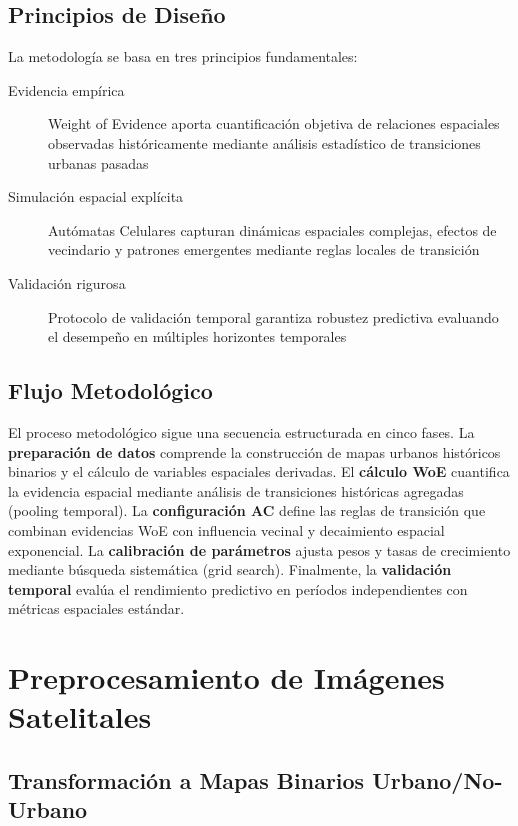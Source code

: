 \subsection{Principios de Diseño}

La metodología se basa en tres principios fundamentales:

\begin{description}
\item[Evidencia empírica] Weight of Evidence aporta cuantificación objetiva de relaciones espaciales observadas históricamente mediante análisis estadístico de transiciones urbanas pasadas
\item[Simulación espacial explícita] Autómatas Celulares capturan dinámicas espaciales complejas, efectos de vecindario y patrones emergentes mediante reglas locales de transición
\item[Validación rigurosa] Protocolo de validación temporal garantiza robustez predictiva evaluando el desempeño en múltiples horizontes temporales
\end{description}

\subsection{Flujo Metodológico}

El proceso metodológico sigue una secuencia estructurada en cinco fases. La \textbf{preparación de datos} comprende la construcción de mapas urbanos históricos binarios y el cálculo de variables espaciales derivadas. El \textbf{cálculo WoE} cuantifica la evidencia espacial mediante análisis de transiciones históricas agregadas (pooling temporal). La \textbf{configuración AC} define las reglas de transición que combinan evidencias WoE con influencia vecinal y decaimiento espacial exponencial. La \textbf{calibración de parámetros} ajusta pesos y tasas de crecimiento mediante búsqueda sistemática (grid search). Finalmente, la \textbf{validación temporal} evalúa el rendimiento predictivo en períodos independientes con métricas espaciales estándar.

\section{Preprocesamiento de Imágenes Satelitales}

\subsection{Transformación a Mapas Binarios Urbano/No-Urbano}

